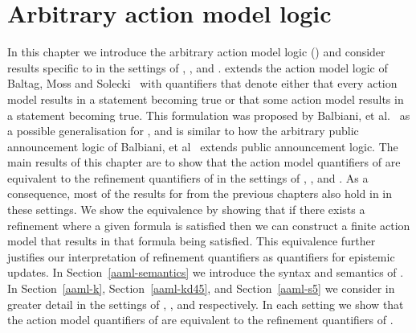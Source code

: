 \chapter{Arbitrary action model logic}\label{aaml}

In this chapter we introduce the arbitrary action model logic (\logicAaml{}) and consider results specific to \logicAaml{} in the settings of \classK{}, \classKFF{}, and \classS{}.
\logicAaml{} extends the action model logic of Baltag, Moss and Solecki~\cite{baltag:1998,baltag:2004} with quantifiers that denote either that every action model results in a statement becoming true or that some action model results in a statement becoming true.
This formulation was proposed by Balbiani, et al.~\cite{balbiani:2007} as a possible generalisation for \logicApal{}, and is similar to how the arbitrary public announcement logic of Balbiani, et al~\cite{balbiani:2008} extends public announcement logic.
The main results of this chapter are to show that the action model quantifiers of \logicAaml{} are equivalent to the refinement quantifiers of \logicRml{} in the settings of \classK{}, \classKFF{}, and \classS{}.
As a consequence, most of the results for \logicRml{} from the previous chapters also hold in \logicAaml{} in these settings.
We show the equivalence by showing that if there exists a refinement where a given formula is satisfied then we can construct a finite action model that results in that formula being satisfied.
This equivalence further justifies our interpretation of refinement quantifiers as quantifiers for epistemic updates.
In Section~\ref{aaml-semantics} we introduce the syntax and semantics of \logicAaml{}.
In Section~\ref{aaml-k}, Section~\ref{aaml-kd45}, and Section~\ref{aaml-s5} we consider \logicAaml{} in greater detail in the settings of \classK{}, \classKFF{}, and \classS{} respectively.
In each setting we show that the action model quantifiers of \logicAaml{} are equivalent to the refinement quantifiers of \logicRml{}.





